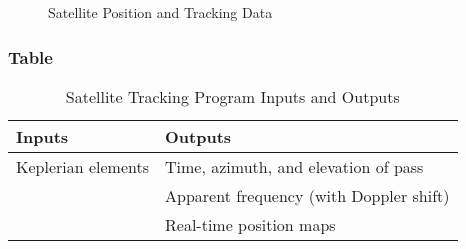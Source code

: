 \begin{figure}[h!]
    \centering
    \caption{Satellite Position and Tracking Data}
    \label{fig:sat-tracking}
\end{figure}

\subsubsection*{Table}

\begin{table}[h!]
    \centering
    \caption{Satellite Tracking Program Inputs and Outputs}
    \label{tab:tracking-inputs-outputs}
    \begin{tabular}{|l|l|}
        \hline
        \textbf{Inputs} & \textbf{Outputs} \\
        \hline
        Keplerian elements & Time, azimuth, and elevation of pass \\
        & Apparent frequency (with Doppler shift) \\
        & Real-time position maps \\
        \hline
    \end{tabular}
\end{table}
